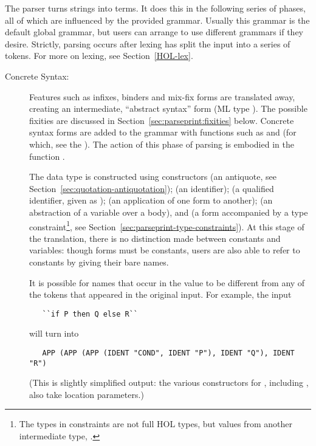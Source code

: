 The parser turns strings into terms.  It does this in the following
series of phases, all of which are influenced by the provided grammar.
Usually this grammar is the default global grammar, but users can
arrange to use different grammars if they desire.  %
%
Strictly, parsing occurs after lexing has split the input into a
series of tokens.  For more on lexing, see Section~\ref{HOL-lex}.
\begin{description}
\item[Concrete Syntax:] Features such as infixes, binders and mix-fix
  forms are translated away, creating an intermediate, ``abstract
  syntax'' form (ML type ).  The possible fixities are
  discussed in Section~\ref{sec:parseprint:fixities} below.  Concrete
  syntax forms are added to the grammar with functions such as
   and  (for which, see the \REFERENCE).
  The action of this phase of parsing is embodied in the function
  .

  The  data type is constructed using constructors 
  (an antiquote, see Section~\ref{sec:quotation-antiquotation}); %
%
%
   (an identifier);  (a qualified identifier,
  given as );  (an application of one form
  to another);  (an abstraction of a variable over a body),
  and  (a form accompanied by a type constraint\footnote{The
    types in  constraints are not full HOL types, but values
    from another intermediate type, .}, see
  Section~\ref{sec:parseprint-type-constraints}).  At this stage of
  the translation, there is no distinction made between constants and
  variables: though  forms must be constants, users are
  also able to refer to constants by giving their bare names.

  It is possible for names that occur in the  value to be
  different from any of the tokens that appeared in the original
  input.  For example, the input
\begin{verbatim}
   ``if P then Q else R``
\end{verbatim} will turn into
\begin{verbatim}
   APP (APP (APP (IDENT "COND", IDENT "P"), IDENT "Q"), IDENT "R")
\end{verbatim}
  (This is slightly simplified output: the various constructors for
  , including , also take location parameters.)


\end{description}
